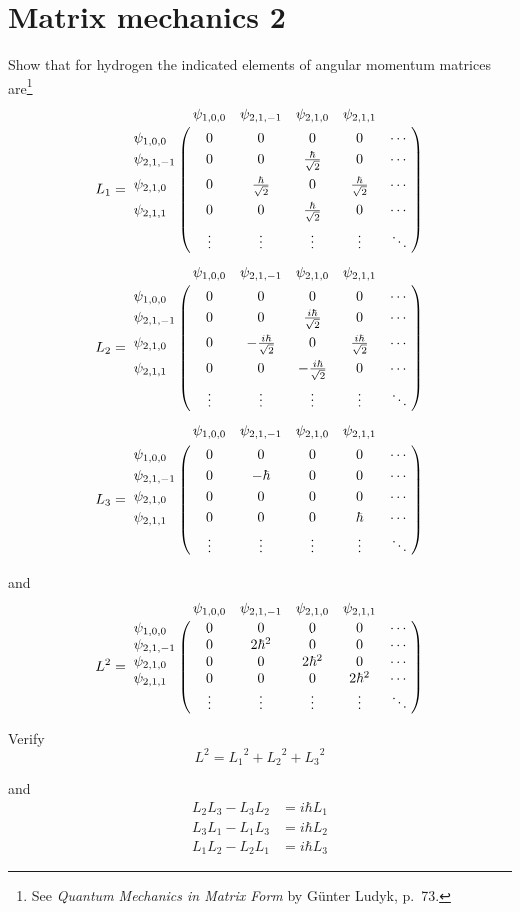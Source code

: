 

\section*{Matrix mechanics 2}

Show that for hydrogen the indicated elements of angular momentum matrices are\footnote
{See {\it Quantum Mechanics in Matrix Form} by G\"unter Ludyk, p.~73.}
\begin{align*}
L_1&=
\bordermatrix{
& \psi_{1,0,0} & \psi_{2,1,-1} & \psi_{2,1,0} & \psi_{2,1,1} \cr
\psi_{1,0,0} & 0 & 0 & 0 & 0 & \cdots \cr
\psi_{2,1,-1} & 0 & 0 & \frac{\hbar}{\sqrt2} & 0 & \cdots \cr
\psi_{2,1,0} & 0 & \frac{\hbar}{\sqrt2} & 0 & \frac{\hbar}{\sqrt2} & \cdots \cr
\psi_{2,1,1} & 0 & 0 & \frac{\hbar}{\sqrt2} & 0 & \cdots \cr
& \vdots & \vdots & \vdots & \vdots & \ddots
}
\\[1ex]
L_2&=
\bordermatrix{
& \psi_{1,0,0} & \psi_{2,1,-1} & \psi_{2,1,0} & \psi_{2,1,1} \cr
\psi_{1,0,0} & 0 & 0 & 0 & 0 & \cdots \cr
\psi_{2,1,-1} & 0 & 0 & \frac{i\hbar}{\sqrt2} & 0 & \cdots \cr
\psi_{2,1,0} & 0 & -\frac{i\hbar}{\sqrt2} & 0 & \frac{i\hbar}{\sqrt2} & \cdots \cr
\psi_{2,1,1} & 0 & 0 & -\frac{i\hbar}{\sqrt2} & 0 & \cdots \cr
& \vdots & \vdots & \vdots & \vdots & \ddots
}
\\[1ex]
L_3&=
\bordermatrix{
& \psi_{1,0,0} & \psi_{2,1,-1} & \psi_{2,1,0} & \psi_{2,1,1} \cr
\psi_{1,0,0} & 0 & 0 & 0 & 0 & \cdots \cr
\psi_{2,1,-1} & 0 & -\hbar & 0 & 0 & \cdots \cr
\psi_{2,1,0} & 0 & 0 & 0 & 0 & \cdots \cr
\psi_{2,1,1} & 0 & 0 & 0 & \hbar & \cdots \cr
& \vdots & \vdots & \vdots & \vdots & \ddots
}
\end{align*}

and
\begin{equation*}
L^2=
\bordermatrix{
& \psi_{1,0,0} & \psi_{2,1,-1} & \psi_{2,1,0} & \psi_{2,1,1} \cr
\psi_{1,0,0} & 0 & 0 & 0 & 0 & \cdots \cr
\psi_{2,1,-1} & 0 & 2\hbar^2 & 0 & 0 & \cdots \cr
\psi_{2,1,0} & 0 & 0 & 2\hbar^2 & 0 & \cdots \cr
\psi_{2,1,1} & 0 & 0 & 0 & 2\hbar^2 & \cdots \cr
& \vdots & \vdots & \vdots & \vdots & \ddots
}
\end{equation*}

Verify
\begin{equation*}
L^2={L_1}^2+{L_2}^2+{L_3}^2
\end{equation*}

and
\begin{align*}
L_2L_3-L_3L_2&=i\hbar L_1
\\
L_3L_1-L_1L_3&=i\hbar L_2
\\
L_1L_2-L_2L_1&=i\hbar L_3
\end{align*}

